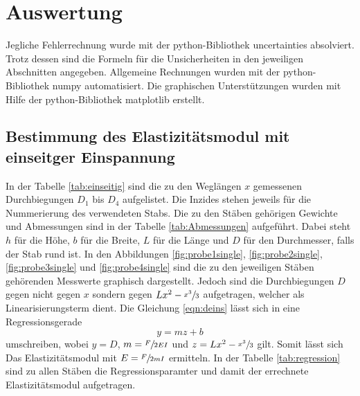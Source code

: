 \section{Auswertung}
\label{sec:Auswertung}
Jegliche Fehlerrechnung wurde mit der python-Bibliothek uncertainties \cite{uncertainties} absolviert.
Trotz dessen sind die Formeln für die Unsicherheiten in den jeweiligen Abschnitten angegeben.
Allgemeine Rechnungen wurden mit der python-Bibliothek numpy \cite{numpy} automatisiert. 
Die graphischen Unterstützungen wurden mit Hilfe der python-Bibliothek matplotlib \cite{matplotlib} erstellt.\\
\subsection{Bestimmung des Elastizitätsmodul mit einseitger Einspannung}
In der Tabelle \ref{tab:einseitig} sind die zu den Weglängen $x$ gemessenen Durchbiegungen $D_1$ bis $D_4$ aufgelistet.
Die Inzides stehen jeweils für die Nummerierung des verwendeten Stabs.
Die zu den Stäben gehörigen Gewichte und Abmessungen sind in der Tabelle \ref{tab:Abmessungen} aufgeführt. 
Dabei steht $h$ für die Höhe, $b$ für die Breite, $L$ für die Länge und $D$ für den Durchmesser, falls der Stab rund ist.
In den Abbildungen \ref{fig:probe1single}, \ref{fig:probe2single}, \ref{fig:probe3single} und \ref{fig:probe4single} sind die 
zu den jeweiligen Stäben gehörenden Messwerte graphisch dargestellt. 
Jedoch sind die Durchbiegungen $D$ gegen nicht gegen $x$ sondern gegen $Lx^2 - \sfrac{x^3}{3}$ aufgetragen, welcher als Linearisierungsterm dient.
Die Gleichung \eqref{eqn:deins} lässt sich in eine Regressionsgerade 
\begin{equation}
  y = m  z + b 
\end{equation}
umschreiben, wobei $y = D$, $m=\sfrac{F}{2EI}$ und $z = Lx^2 - \sfrac{x^3}{3}$ gilt.
Somit lässt sich Das Elastizitätsmodul mit $E = \sfrac{F}{2mI}$ ermitteln.
In der Tabelle \ref{tab:regression} sind zu allen Stäben die Regressionsparamter und damit der errechnete Elastizitätsmodul aufgetragen.
